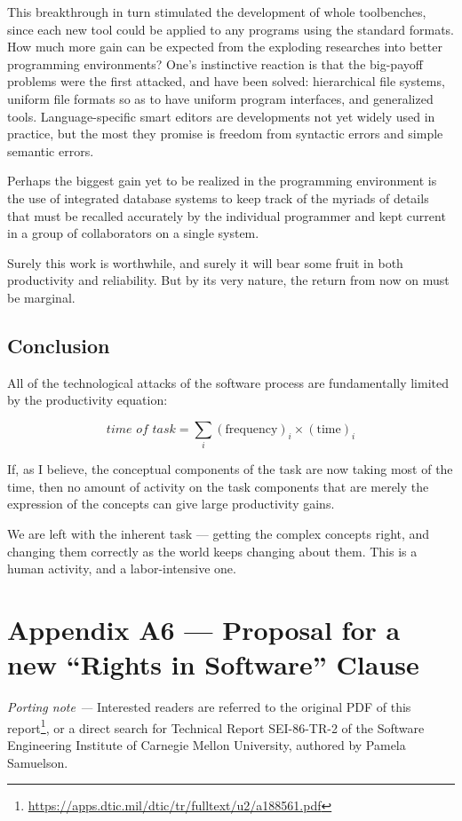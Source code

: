 \documentclass[12pt]{article}
\begin{document}
This breakthrough in turn stimulated the development of whole toolbenches,
since each new tool could be applied to any programs using the standard
formats. How much more gain can be expected from the exploding researches into
better programming environments?  One's instinctive reaction is that the
big-payoff problems were the first attacked, and have been solved: hierarchical
file systems, uniform file formats so as to have uniform program interfaces,
and generalized tools. Language-specific smart editors are developments not yet
widely used in practice, but the most they promise is freedom from syntactic
errors and simple semantic errors.

Perhaps the biggest gain yet to be realized in the programming environment is
the use of integrated database systems to keep track of the myriads of details
that must be recalled accurately by the individual programmer and kept current
in a group of collaborators on a single system.

Surely this work is worthwhile, and surely it will bear some fruit in both
productivity and reliability. But by its very nature, the return from now on
must be marginal.

\subsection*{Conclusion}

All of the technological attacks of the software process are fundamentally
limited by the productivity equation:

\[\textit{time of task} = \sum_i (\textrm{frequency})_i \times (\textrm{time})_i\]

If, as I believe, the conceptual components of the task are now taking most of
the time, then no amount of activity on the task components that are merely the
expression of the concepts can give large productivity gains.

We are left with the inherent task — getting the complex concepts right, and
changing them correctly as the world keeps changing about them. This is a human
activity, and a labor-intensive one.

\newpage

\section*{Appendix A6 — Proposal for a new “Rights in Software” Clause}

\textit{Porting note —} Interested readers are referred to the original PDF of
this
report\footnote{\url{https://apps.dtic.mil/dtic/tr/fulltext/u2/a188561.pdf}},
or a direct search for Technical Report SEI-86-TR-2 of the Software Engineering
Institute of Carnegie Mellon University, authored by Pamela Samuelson.
\end{document}
